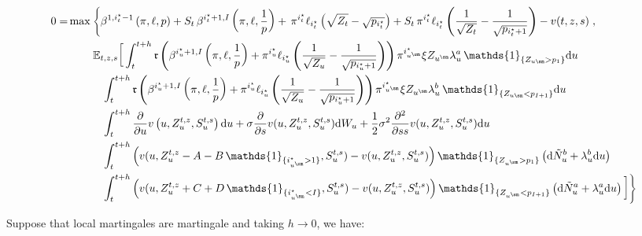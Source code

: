 \documentclass[8pt]{article}
\renewcommand{\d}{\mathrm{d}}
\begin{document}
\begin{equation}
\begin{aligned}
    0 = & \max \left\{ \beta^{1,i^\star_{t} -1} \left(\pi, \ell, p\right) + S_{t}\,\beta^{i^\star_{t}+1, I} \left(\pi, \ell, \frac{1}{p} \right) +\, \pi^{i^\star_{t}} \ell_{i^\star_{t}}\left(\sqrt{Z_{t}}-\sqrt{p_{i^\star_{t}}}\right) + S_{t}\,\pi^{i^\star_{t}} \ell_{i^\star_{t}}\left(\frac{1}{\sqrt{Z_{t}}}-\frac{1}{\sqrt{p_{i^\star_{t} +1}}}\right) - v(t,z,s) \right., \\ 
     & \qquad \left. \mathbb{E}_{t,z,s}\bigg[\int_{t}^{t+h}  \mathfrak{r}\left( \beta^{i^\star_u+1,I} \left(\pi, \ell, \frac{1}{p} \right) + \pi^{i^\star_u} \ell_{i^\star_u}\left(\frac{1}{\sqrt{Z_u}}-\frac{1}{\sqrt{p_{i^\star_u +1}}}\right) \right) \pi^{i^\star_{u^\sm}} \xi Z_{u^\sm} \lambda^a_u \, \mathds{1}_{\{Z_{u\sm} > p_1\}} \d u \bigg. \right.\\
    & \qquad \quad \left. \int_t^{t+h} \mathfrak{r}\left(\beta^{i^\star_u+1,I} \left(\pi, \ell, \frac{1}{p} \right) + \pi^{i^\star_u} \ell_{i^\star_u}\left(\frac{1}{\sqrt{Z_u}}-\frac{1}{\sqrt{p_{i^\star_u +1}}}\right)\right) \pi^{i^\star_{u^\sm}} \xi Z_{u^\sm} \lambda^b_u \, \mathds{1}_{\{Z_{u\sm} < p_{I+1}\}} \d u \bigg. \right. \nonumber \\
    & \qquad \quad \left. \int_{t}^{t+h} \frac{\partial}{\partial u} v\left(u,Z_u^{t,z},S_u^{t,s}\right) \d u + \sigma \frac{\partial}{\partial s} v(u,Z_u^{t,z},S_u^{t,s}) \d W_u + \frac{1}{2} \sigma^2 \frac{\partial^2}{\partial ss} v(u,Z_u^{t,z},S_u^{t,s}) \d u \bigg. \right. \\
    & \qquad \quad \left. \int_{t}^{t+h} \left(v(u,Z_u^{t,z} - A - B \, \mathds{1}_{\{i^\star_{u^\sm} > 1\}}, S_u^{t,s}) - v(u,Z_u^{t,z},S_u^{t,s})\right) \mathds{1}_{\{Z_{u^\sm} >p_1\}} \left(\d \tilde{N}^b_u + \lambda^b_u \d u\right)\bigg. \right. \\
    & \qquad \quad \left. \int_{t}^{t+h} \left(v(u,Z_u^{t,z} + C + D \, \mathds{1}_{\{i^\star_{u^\sm} < I\}}, S_u^{t,s}) - v(u,Z_u^{t,z},S_u^{t,s})\right) \mathds{1}_{\{Z_{u^\sm} <p_{I+1}\}} \left(\d \tilde{N}^a_u + \lambda^a_u \d u\right) \bigg. \bigg] \right\}
\end{aligned}
\end{equation}

Suppose that local martingales are martingale and taking $h \longrightarrow 0$, we have:
\end{document}
